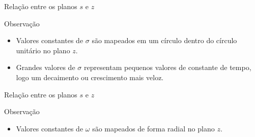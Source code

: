 \begin{frame}{Relação entre os planos $s$ e $z$}
\begin{block}{Observação}
\begin{itemize}
	\item Valores constantes de $ \sigma $ são mapeados em um círculo dentro do círculo unitário no plano $ z $.
	\item Grandes valores de $ \sigma $ representam pequenos valores de constante de tempo, logo um decaimento ou crescimento mais veloz.
\end{itemize}
\end{block}


\begin{minipage}{0.45\linewidth}
	\centering
	
	\scalebox{0.9}{}
\end{minipage}
\hfill
\begin{minipage}{0.45\linewidth}
	\centering
	
	\scalebox{0.65}{}
\end{minipage}

\end{frame}


\begin{frame}{Relação entre os planos $s$ e $z$}
\begin{block}{Observação}
\begin{itemize}
	\item Valores constantes de $\omega$ são mapeados de forma radial no plano $ z $.
\end{itemize}
\end{block}

\vspace{0.5cm}

\begin{minipage}{0.45\linewidth}
	\centering
	
	\scalebox{1}{}
\end{minipage}
\hfill
\begin{minipage}{0.45\linewidth}
	\centering
	
	\scalebox{0.7}{}
\end{minipage}

\end{frame}

